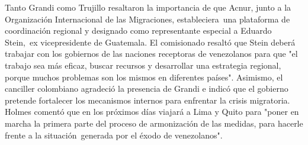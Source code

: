 \documentclass{article}%
\begin{document}
\newline%
%
Tanto Grandi como Trujillo resaltaron la importancia de que Acnur, junto a la Organización Internacional de las Migraciones, estableciera~una plataforma de coordinación regional y designado como representante especial a Eduardo Stein,~ex vicepresidente de Guatemala.%
\newline%
%
El comisionado resaltó que Stein deberá trabajar con los gobiernos de las naciones receptoras de venezolanos para que "el trabajo sea más eficaz, buscar recursos y desarrollar una estrategia regional, porque muchos problemas son los mismos en diferentes países".%
\newline%
%
Asimismo, el canciller colombiano agradeció la presencia de Grandi e indicó que el gobierno pretende fortalecer los mecanismos internos para enfrentar la crisis migratoria.%
\newline%
%
Holmes comentó que en los próximos días viajará a Lima y Quito para "poner en marcha la primera parte del proceso de armonización de las medidas, para hacerle frente a la situación~generada por el éxodo de venezolanos".%
\newline%
%
\end{document}
